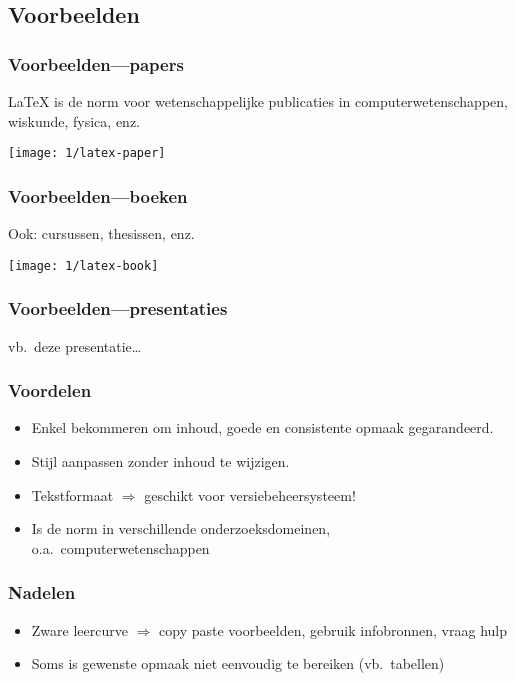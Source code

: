 \documentclass[aspectratio=169]{beamer}
\begin{document}
\subsection{Voorbeelden}

\begin{frame}
  \frametitle{Voorbeelden---papers}

  {\LaTeX} is de norm voor wetenschappelijke publicaties in computerwetenschappen, wiskunde, fysica, enz.

  \begin{center}
    \texttt{[image: 1/latex-paper]}
  \end{center}

\end{frame}

\begin{frame}
  \frametitle{Voorbeelden---boeken}

  Ook: cursussen, thesissen, enz.

  \begin{center}
    \texttt{[image: 1/latex-book]}
  \end{center}

\end{frame}

\begin{frame}
  \frametitle{Voorbeelden---presentaties}

  \begin{center}
    vb.\ deze presentatie\ldots
  \end{center}

\end{frame}

\begin{frame}
  \frametitle{Voordelen}

  \begin{itemize}
    \item<+-> Enkel bekommeren om inhoud, goede en consistente opmaak gegarandeerd.
    \item<+-> Stijl aanpassen zonder inhoud te wijzigen.
    \item<+-> Tekstformaat \(\Rightarrow\) geschikt voor versiebeheersysteem!
    \item<+-> Is de norm in verschillende onderzoeksdomeinen, o.a.\ computerwetenschappen
  \end{itemize}
\end{frame}


\begin{frame}
  \frametitle{Nadelen}

  \begin{itemize}
    \item<+-> Zware leercurve \(\Rightarrow\) copy paste voorbeelden, gebruik infobronnen, vraag hulp
    \item<+-> Soms is gewenste opmaak niet eenvoudig te bereiken (vb.~tabellen)
  \end{itemize}

\end{frame}
\end{document}
